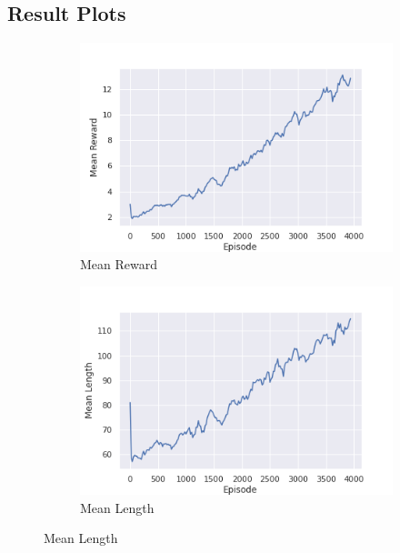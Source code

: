 \begin{appendices}
    \clearpage
    \onecolumn
    \section{Result Plots}\label{app:results}
    \begin{figure}[h]
        \centering{}
        \begin{subfigure}{0.49\linewidth}
            \centering{}
            \includegraphics[width=\linewidth, height=0.3\textheight, keepaspectratio]{img/result_img/mean_reward.png}
            \caption{Mean Reward}
        \end{subfigure}
        \begin{subfigure}{0.49\linewidth}
            \centering{}
            \includegraphics[width=\linewidth, height=0.3\textheight, keepaspectratio]{img/result_img/mean_length.png}
            \caption{Mean Length}
        \end{subfigure}

\end{figure}
\end{appendices}
